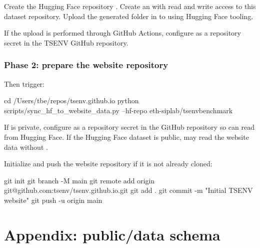 \documentclass[11pt]{article}
\begin{document}
Create the Hugging Face repository .
Create an  with read and write access to this dataset repository.
Upload the generated folder in  to  using Hugging Face tooling.

If the upload is performed through GitHub Actions, configure  as a repository secret in the TSENV GitHub repository.

\subsubsection*{Phase 2: prepare the website repository}
Then trigger:
\begin{DocCode}
cd /Users/tbe/repos/tsenv.github.io
python scripts/sync_hf_to_website_data.py --hf-repo eth-siplab/tsenvbenchmark
\end{DocCode}

If  is private, configure  as a repository secret in the  GitHub repository so  can read from Hugging Face.
If the Hugging Face dataset is public,  may read the website data without .

Initialize and push the website repository if it is not already cloned:
\begin{DocCode}
git init
git branch -M main
git remote add origin git@github.com:tsenv/tsenv.github.io.git
git add .
git commit -m "Initial TSENV website"
git push -u origin main
\end{DocCode}

\section*{Appendix: public/data schema}
\label{sec:website-generated-json}\label{sec:website-generated-json-file-list}\label{sec:website-public-data-schema-appendix}
\end{document}
